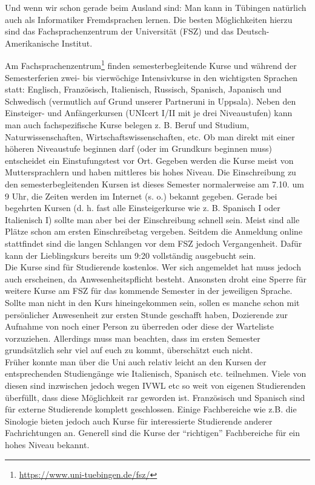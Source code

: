 Und wenn wir schon gerade beim Ausland sind: Man kann in Tübingen
  natürlich auch als Informatiker Fremdsprachen lernen.  Die besten
  Möglichkeiten hierzu sind das Fachsprachenzentrum der
  Universität (FSZ) und das Deutsch-Amerikanische Institut.


Am Fachsprachenzentrum\footnote{\url{https://www.uni-tuebingen.de/fsz/}} finden
  semesterbegleitende Kurse und während der Semesterferien zwei- bis
  vierwöchige Intensivkurse in den wichtigsten Sprachen statt:
  Englisch, Französisch, Italienisch, Russisch, Spanisch, Japanisch und Schwedisch (vermutlich auf Grund unserer Partneruni in Uppsala). Neben den
  Einsteiger- und Anfängerkursen (UNIcert I/II mit je drei
  Niveaustufen) kann man auch fachspezifische Kurse belegen
  z. B. Beruf und Studium, Naturwissenschaften,
  Wirtschaftswissenschaften, etc.  Ob man direkt mit einer höheren
  Niveaustufe beginnen darf (oder im Grundkurs beginnen muss)
  entscheidet ein Einstufungstest vor Ort.  Gegeben werden die Kurse
  meist von Muttersprachlern und haben mittleres bis hohes Niveau.
  Die Einschreibung zu den semesterbegleitenden Kursen ist dieses Semester normalerweise am 7.10. um 9 Uhr, die Zeiten werden im
  Internet (s. o.) bekannt gegeben.  Gerade bei begehrten Kursen
  (d. h. fast alle Einsteigerkurse wie z. B. Spanisch I oder
  Italienisch I) sollte man aber bei der  Einschreibung schnell sein.
  Meist sind alle Plätze schon am ersten Einschreibetag vergeben. Seitdem die Anmeldung online stattfindet sind die langen Schlangen vor dem FSZ jedoch Vergangenheit. Dafür kann der Lieblingskurs bereits um 9:20 vollständig ausgebucht sein.\\
  Die Kurse sind für Studierende kostenlos. Wer sich angemeldet hat muss jedoch auch erscheinen, da Anwesenheitspflicht besteht. Ansonsten droht eine Sperre für weitere Kurse am FSZ für das kommende Semester in der jeweiligen Sprache. Sollte man nicht in den Kurs hineingekommen sein, sollen es manche schon mit persönlicher Anwesenheit zur ersten Stunde geschafft haben, Dozierende zur Aufnahme von noch einer Person zu überreden oder diese der Warteliste vorzuziehen. Allerdings muss man beachten, dass im ersten Semester grundsätzlich sehr viel auf euch zu kommt, überschätzt euch nicht.\\

Früher konnte man über die Uni auch relativ leicht an den Kursen der entsprechenden Studiengänge wie Italienisch, Spanisch etc. teilnehmen. Viele von diesen sind inzwischen jedoch wegen IVWL etc so weit von eigenen Studierenden überfüllt, dass diese Möglichkeit rar geworden ist. Französisch und Spanisch sind für externe Studierende komplett geschlossen. Einige Fachbereiche wie z.B. die Sinologie bieten jedoch auch Kurse für interessierte Studierende anderer Fachrichtungen an.  Generell sind die Kurse der "`richtigen"' Fachbereiche für ein hohes Niveau bekannt.
  
